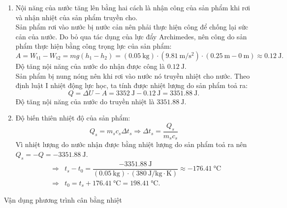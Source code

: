 \begin{vd}
{\begin{enumerate}[label=\alph*)]
			$$\Delta U=Q_n=\SI{3352}{\joule}.$$
			\item Nội năng của nước tăng lên bằng hai cách là nhận công của sản phẩm khi rơi và nhận nhiệt của sản phẩm truyền cho.\\
			Sản phẩm rơi vào nước bị nước cản nên phải thực hiện công để chống lại sức cản của nước. Do bỏ qua tác dụng của lực đẩy Archimedes, nên công do sản phẩm thực hiện bằng công trọng lực của sản phẩm:
			$$A=W_\text{t1}-W_\text{t2}=mg\left(h_1-h_2\right)=\left(\SI{0.05}{\kilogram}\right)\cdot\left(\SI{9.81}{\meter/\second^2}\right)\cdot\left(\SI{0.25}{\meter}-\SI{0}{\meter}\right)\approx\SI{0.12}{\joule}.$$
			Độ tăng nội năng của nước do nhận được công là $\SI{0.12}{\joule}$.\\
			Sản phẩm bị nung nóng nên khi rơi vào nước nó truyền nhiệt cho nước. Theo định luật I nhiệt động lực học, ta tính được nhiệt lượng do sản phẩm toả ra:
			$$Q=\Delta U-A=\SI{3352}{\joule}-\SI{0.12}{\joule}=\SI{3351.88}{\joule}.$$
			Độ tăng nội năng của nước do truyền nhiệt là $\SI{3351.88}{\joule}.$
			\item Độ biến thiên nhiệt độ của sản phẩm:
			$$Q_s=m_sc_s\Delta t_s\Rightarrow \Delta t_s=\dfrac{Q_s}{m_sc_s}$$
			Vì nhiệt lượng do nước nhận được bằng nhiệt lượng do sản phẩm toả ra nên $Q_s=-Q=-\SI{3351.88}{\joule}.$
			\begin{eqnarray*}
				&	\Rightarrow& t_s-t_0=\dfrac{-\SI{3351.88}{\joule}}{\left(\SI{0.05}{\kilogram}\right)\cdot\left(\SI{380}{\joule/\kilogram\cdot\kelvin}\right)}\approx-\SI{176.41}{\celsius}
				\\
				&\Rightarrow& t_0=t_s+\SI{176.41}{\celsius}=\SI{198.41}{\celsius}.
			\end{eqnarray*}
	\end{enumerate}}
\end{vd}
\begin{dang}{Vận dụng phương trình cân bằng nhiệt}
	\end{dang}

